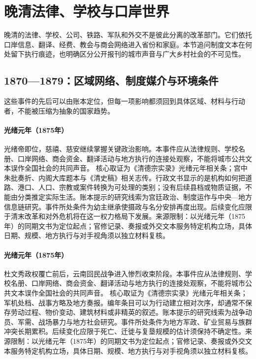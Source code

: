 \section{晚清法律、学校与口岸世界}
晚清的法律、学校、公司、铁路、军队和外交不是彼此分离的改革部门。它们依托口岸信息、翻译、经费、教会与商会网络进入省份和家庭。本节追问制度文本在何处留下执行痕迹，也明确区分公开报刊的城市声音与广大乡村社会的不可见性。
\subsection{1870—1879：区域网络、制度媒介与环境条件}
这些事件的先后可以由账本定位，但每一项影响都须回到具体区域、材料与行动者，不能被压缩为抽象的国家趋势。
\hypertarget{civic:EQ-1875-GUANGXU-ACCESSION}{}\paragraph{光绪元年（1875年）}光绪帝即位，慈禧、慈安继续掌握关键政治影响。本事件应从法律规则、学校名册、口岸网络、商会资金、翻译活动与地方执行的连接处观察，不能将城市公共文本误作全国社会的共同声音。 核心取证为《清德宗实录》光绪元年相关条；宫中朱批奏折、内阁大库题本与《清史稿》相关志传。行政文书显示的是机构如何把道路、港口、人口、宗教或案件转换为可处理的类别；没有后续县档或物质证据，不能由分类推定实际生活。账本提示的研究线索为宫廷政治、制度运作与中央—地方信息链研究。事件所处条件为幼主继承使摄政与名分安排再度出现。后续变化应限于清末改革和对外危机将在这一权力格局下发展。来源限制：以光绪元年（1875年）的同期文书为定位起点；官修记录、奏报或外交文本服务特定机构立场，具体日期、规模、地方执行与对手视角须以独立材料复核。
\hypertarget{civic:EQ-1875-YUNNAN-MUSLIM-WAR}{}\paragraph{光绪元年（1875年）}杜文秀政权覆亡前后，云南回民战争进入惨烈收束阶段。本事件应从法律规则、学校名册、口岸网络、商会资金、翻译活动与地方执行的连接处观察，不能将城市公共文本误作全国社会的共同声音。 核心取证为《清德宗实录》光绪元年相关条；军机处档、战事方略及地方奏报。编年条目可以为行动建立相对次序，却通常不保存劳动过程、物价变动、建筑材料或非精英的叙述。账本提示的研究线索为战争动员、军需、战场暴力与地方社会研究。事件所处条件为地方军政、矿业贸易与族群冲突长期累积。后续变化应限于死亡、迁徙与复垦规模的估计须保持不确定性。来源限制：以光绪元年（1875年）的同期文书为定位起点；官修记录、奏报或外交文本服务特定机构立场，具体日期、规模、地方执行与对手视角须以独立材料复核。
